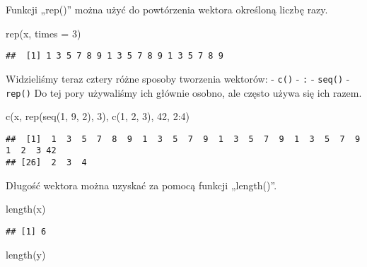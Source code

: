 \documentclass[
]{article}
\newenvironment{Shaded}{\begin{snugshade}}{\end{snugshade}}
\newcommand{\AttributeTok}[1]{\textcolor[rgb]{0.77,0.63,0.00}{#1}}
\newcommand{\DecValTok}[1]{\textcolor[rgb]{0.00,0.00,0.81}{#1}}
\newcommand{\FunctionTok}[1]{\textcolor[rgb]{0.00,0.00,0.00}{#1}}
\newcommand{\NormalTok}[1]{#1}
\newcommand{\SpecialCharTok}[1]{\textcolor[rgb]{0.00,0.00,0.00}{#1}}
\begin{document}
Funkcji „rep()'' można użyć do powtórzenia wektora określoną liczbę
razy.

\begin{Shaded}
\begin{Highlighting}[]
\FunctionTok{rep}\NormalTok{(x, }\AttributeTok{times =} \DecValTok{3}\NormalTok{)}
\end{Highlighting}
\end{Shaded}

\begin{verbatim}
##  [1] 1 3 5 7 8 9 1 3 5 7 8 9 1 3 5 7 8 9
\end{verbatim}

Widzieliśmy teraz cztery różne sposoby tworzenia wektorów: -
\texttt{c()} - \texttt{:} - \texttt{seq()} - \texttt{rep()} Do tej pory
używaliśmy ich głównie osobno, ale często używa się ich razem.

\begin{Shaded}
\begin{Highlighting}[]
\FunctionTok{c}\NormalTok{(x, }\FunctionTok{rep}\NormalTok{(}\FunctionTok{seq}\NormalTok{(}\DecValTok{1}\NormalTok{, }\DecValTok{9}\NormalTok{, }\DecValTok{2}\NormalTok{), }\DecValTok{3}\NormalTok{), }\FunctionTok{c}\NormalTok{(}\DecValTok{1}\NormalTok{, }\DecValTok{2}\NormalTok{, }\DecValTok{3}\NormalTok{), }\DecValTok{42}\NormalTok{, }\DecValTok{2}\SpecialCharTok{:}\DecValTok{4}\NormalTok{)}
\end{Highlighting}
\end{Shaded}

\begin{verbatim}
##  [1]  1  3  5  7  8  9  1  3  5  7  9  1  3  5  7  9  1  3  5  7  9  1  2  3 42
## [26]  2  3  4
\end{verbatim}

Długość wektora można uzyskać za pomocą funkcji „length()''.

\begin{Shaded}
\begin{Highlighting}[]
\FunctionTok{length}\NormalTok{(x)}
\end{Highlighting}
\end{Shaded}

\begin{verbatim}
## [1] 6
\end{verbatim}

\begin{Shaded}
\begin{Highlighting}[]
\FunctionTok{length}\NormalTok{(y)}
\end{Highlighting}
\end{Shaded}
\end{document}
